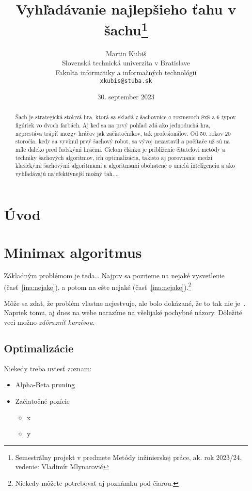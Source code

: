 \documentclass[10pt,twoside,slovak,a4paper]{article}
\title{Vyhľadávanie najlepšieho ťahu v šachu\thanks{Semestrálny projekt v predmete Metódy inžinierskej práce, ak. rok 2023/24, vedenie: Vladimír Mlynarovič}} %
\author{Martin Kubiš\\[2pt]
	{\small Slovenská technická univerzita v Bratislave}\\
	{\small Fakulta informatiky a informačných technológií}\\
	{\small \texttt{xkubis@stuba.sk}}
	}
\date{\small 30. september 2023} %
\begin{document}
\maketitle

\begin{abstract}
Šach je strategická stolová hra, ktorá sa skladá z šachovnice o rozmeroch 8x8 a 6 typov figúriek vo dvoch farbách. Aj keď sa na prvý pohľad zdá ako jednoduchá hra, neprestáva trápiť mozgy hráčov jak začiatočníkov, tak profesionálov. Od 50. rokov 20 storočia, kedy sa vyvinul prvý šachový robot, sa vývoj nezastavil a počítače už sú na míle ďaleko pred ľudskými hráčmi. Cielom článku je priblíženie čitateľovi metódy a techniky šachových algoritmov, ich optimalizácia, takisto aj porovnanie medzi klasickými šachovými algoritmami a algoritmami obohatené o umelú inteligenciu a ako vyhľadávajú najefektívnejší možný ťah.
\ldots
\end{abstract}



\section{Úvod}



\section{Minimax algoritmus} \label{minimax}

Základným problémom je teda\ldots{} Najprv sa pozrieme na nejaké vysvetlenie (časť~\ref{ina:nejake}), a potom na ešte nejaké (časť~\ref{ina:nejake}).\footnote{Niekedy môžete potrebovať aj poznámku pod čiarou.}

Môže sa zdať, že problém vlastne nejestvuje\cite{Coplien:MPD}, ale bolo dokázané, že to tak nie je~\cite{Czarnecki:Staged, Czarnecki:Progress}. Napriek tomu, aj dnes na webe narazíme na všelijaké pochybné názory\cite{PLP-Framework}. Dôležité veci možno \emph{zdôrazniť kurzívou}.


\subsection{Optimalizácie} \label{Optimalizacie}

Niekedy treba uviesť zoznam:

\begin{itemize}
\item Alpha-Beta pruning
\item Začiatočné pozície
	\begin{itemize}
	\item x
	\item y
	\end{itemize}
\end{itemize}
\end{document}
